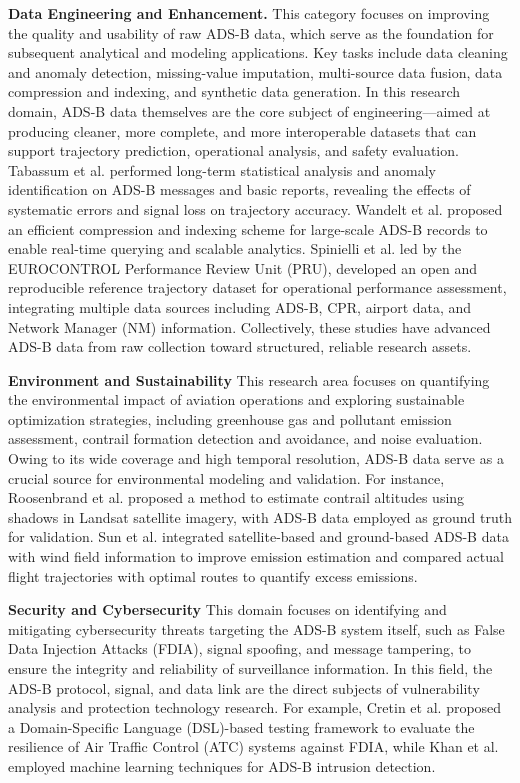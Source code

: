 \textbf{Data Engineering and Enhancement.} 
This category focuses on improving the quality and usability of raw ADS-B data, which serve as the foundation for subsequent analytical and modeling applications. Key tasks include data cleaning and anomaly detection, missing-value imputation, multi-source data fusion, data compression and indexing, and synthetic data generation. In this research domain, ADS-B data themselves are the core subject of engineering—aimed at producing cleaner, more complete, and more interoperable datasets that can support trajectory prediction, operational analysis, and safety evaluation. Tabassum et al. \cite{tabassum2017ads} performed long-term statistical analysis and anomaly identification on ADS-B messages and basic reports, revealing the effects of systematic errors and signal loss on trajectory accuracy. Wandelt et al. \cite{wandelt2018ads} proposed an efficient compression and indexing scheme for large-scale ADS-B records to enable real-time querying and scalable analytics. Spinielli et al. \cite{spinielli2017initial} led by the EUROCONTROL Performance Review Unit (PRU), developed an open and reproducible reference trajectory dataset for operational performance assessment, integrating multiple data sources including ADS-B, CPR, airport data, and Network Manager (NM) information. Collectively, these studies have advanced ADS-B data from raw collection toward structured, reliable research assets.

\textbf{Environment and Sustainability}
This research area focuses on quantifying the environmental impact of aviation operations and exploring sustainable optimization strategies, including greenhouse gas and pollutant emission assessment, contrail formation detection and avoidance, and noise evaluation. Owing to its wide coverage and high temporal resolution, ADS-B data serve as a crucial source for environmental modeling and validation. For instance, Roosenbrand et al. \cite{roosenbrand2023contrail} proposed a method to estimate contrail altitudes using shadows in Landsat satellite imagery, with ADS-B data employed as ground truth for validation. Sun et al. \cite{sun2023evaluating} integrated satellite-based and ground-based ADS-B data with wind field information to improve emission estimation and compared actual flight trajectories with optimal routes to quantify excess emissions.

\textbf{Security and Cybersecurity}
This domain focuses on identifying and mitigating cybersecurity threats targeting the ADS-B system itself, such as False Data Injection Attacks (FDIA), signal spoofing, and message tampering, to ensure the integrity and reliability of surveillance information. In this field, the ADS-B protocol, signal, and data link are the direct subjects of vulnerability analysis and protection technology research. For example, Cretin et al. \cite{cretin2018increasing} proposed a Domain-Specific Language (DSL)-based testing framework to evaluate the resilience of Air Traffic Control (ATC) systems against FDIA, while Khan et al. \cite{khan2021intrusion} employed machine learning techniques for ADS-B intrusion detection.

